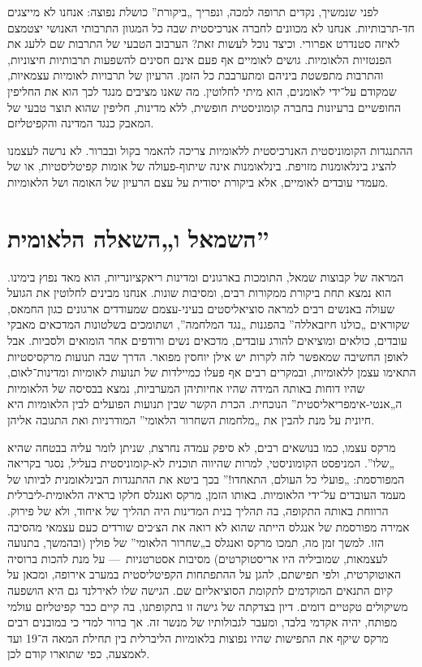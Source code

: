 לפני שנמשיך, נקדים תרופה למכה, ונפריך „ביקורת” כושלת נפוצה: אנחנו לא מייצגים חד-תרבותיות. אנחנו לא מכוונים לחברה אנרכיסטית שבה כל המגוון התרבותי האנושי יצטמצם לאיזה סטנדרט אפרורי. וכיצד נוכל לעשות זאת? הערבוב הטבעי של התרבות שם ללעג את הפנטזיות הלאומיות. גושים לאומיים אף פעם אינם חסינים להשפעות תרבותיות חיצוניות, והתרבות מתפשטת ביניהם ומתערבבת כל הזמן. הרעיון של תרבויות לאומיות עצמאיות, שמקודם על־ידי לאומנים, הוא מיתי לחלוטין. מה שאנו מציבים מנגד לכך הוא את החליפין החופשיים ברעיונות בחברה קומוניסטית חופשית, ללא מדינות, חליפין שהוא תוצר טבעי של המאבק כנגד המדינה והקפיטליזם.

ההתנגדות הקומוניסטית האנרכיסטית ללאומיות צריכה להאמר בקול ובברור. לא נרשה לעצמנו להציג בינלאומנות מזויפת. בינלאומנות אינה שיתוף-פעולה של אומות קפיטליסטיות, או של מעמדי עובדים לאומיים, אלא ביקורת יסודית על עצם הרעיון של האומה ושל הלאומיות.



\section*{השמאל ו„השאלה הלאומית”}

המראה של קבוצות שמאל, התומכות בארגונים ומדינות ריאקציונריות, הוא מאד נפוץ בימינו. הוא נמצא תחת ביקורת ממקורות רבים, ומסיבות שונות. אנחנו מבינים לחלוטין את הגועל שעולה באנשים רבים למראה סוציאליסטים בעיני-עצמם שמעודדים ארגונים כגון החמאס, שקוראים „כולנו חיזבאללה” בהפגנות „נגד המלחמה”, ושתומכים בשלטונות המדכאים מאבקי עובדים, כולאים ומוציאים להורג עובדים, מדכאים נשים ורודפים אחר הומואים ולסביות. אבל לאופן החשיבה שמאפשר לזה לקרות יש אילן יוחסין מפואר. הדרך שבה תנועות מרקסיסטיות התאימו עצמן ללאומיות, ובמקרים רבים אף פעלו כמיילדות של תנועות לאומיות ומדינות־לאום, שהיו דוחות באותה המידה שהיו אחיותיהן המערביות, נמצא בבסיסה של הלאומיות ה„אנטי-אימפריאליסטית” הנוכחית. הכרת הקשר שבין תנועות הפועלים לבין הלאומיות היא חיונית על מנת להבין את „מלחמות השחרור הלאומי” המודרניות ואת התגובה אליהן.

מרקס עצמו, כמו בנושאים רבים, לא סיפק עמדה נחרצת, שניתן לומר עליה בבטחה שהיא „שלו”. המניפסט הקומוניסטי, למרות שהיווה תוכנית לא-קומוניסטית בעליל, נסגר בקריאה המפורסמת: „פועלי כל העולם, התאחדו!” בכך ביטא את ההתנגדות הבינלאומנית לביותו של מעמד העובדים על־ידי הלאומיות. באותו הזמן, מרקס ואנגלס חלקו בראיה הלאומית-ליברלית הרווחת באותה התקופה, בה תהליך בנית המדינות היה תהליך של איחוד, ולא של פירוק. אמירה מפורסמת של אנגלס הייתה שהוא לא רואה את הצ׳כים שורדים כעם עצמאי מהסיבה הזו. למשך זמן מה, תמכו מרקס ואנגלס ב„שחרור הלאומי” של פולין (ובהמשך, בתנועה לעצמאות, שמוביליה היו אריסטוקרטים) מסיבות אסטרטגיות~— על מנת להכות ברוסיה האוטוקרטית, ולפי תפישתם, להגן על ההתפתחות הקפיטליסטית במערב אירופה, ומכאן על קיום התנאים המוקדמים לתקומת הסוציאליזם שם. הגישה שלו לאירלנד גם היא הושפעה משיקולים טקטיים דומים. דיון בצדקתה של גישה זו בתקופתנו, בה קיים כבר קפיטליזם עולמי מפותח, יהיה אקדמי בלבד, ומעבר לגבולותיו של מנשר זה. אך ברור למדי כי במובנים רבים מרקס שיקף את התפישות שהיו נפוצות בלאומיות הליברלית בין תחילת המאה ה־19 ועד לאמצעה, כפי שתוארו קודם לכן.

